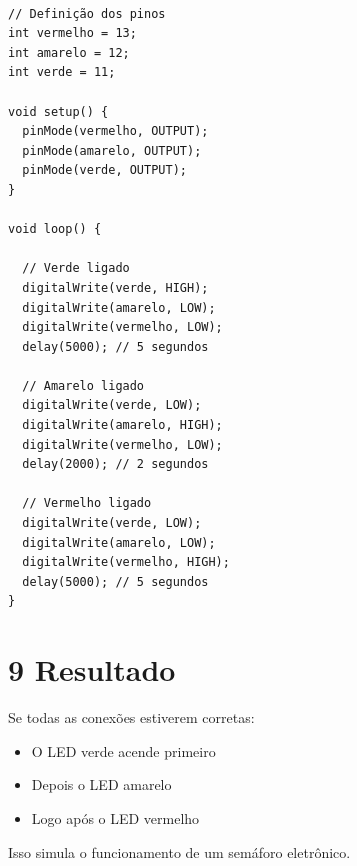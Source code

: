 \documentclass[12pt,a4paper]{article}
\begin{document}
\begin{tcolorbox}

\begin{verbatim}

// Definição dos pinos
int vermelho = 13;
int amarelo = 12;
int verde = 11;

void setup() {
  pinMode(vermelho, OUTPUT);
  pinMode(amarelo, OUTPUT);
  pinMode(verde, OUTPUT);
}

void loop() {

  // Verde ligado
  digitalWrite(verde, HIGH);
  digitalWrite(amarelo, LOW);
  digitalWrite(vermelho, LOW);
  delay(5000); // 5 segundos

  // Amarelo ligado
  digitalWrite(verde, LOW);
  digitalWrite(amarelo, HIGH);
  digitalWrite(vermelho, LOW);
  delay(2000); // 2 segundos

  // Vermelho ligado
  digitalWrite(verde, LOW);
  digitalWrite(amarelo, LOW);
  digitalWrite(vermelho, HIGH);
  delay(5000); // 5 segundos
}

\end{verbatim}

\end{tcolorbox}

\section*{ }
\section*{9 Resultado}

\noindent
Se todas as conexões estiverem corretas:

\begin{itemize}

\item O LED verde acende primeiro
\item Depois o LED amarelo
\item Logo após o LED vermelho

\end{itemize}

\noindent
Isso simula o funcionamento de um semáforo eletrônico.
\end{document}
